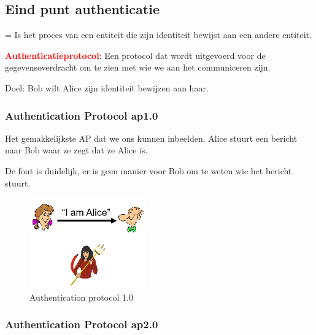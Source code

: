 \newpage
\subsection{Eind punt authenticatie}

\noindent = Is het proces van een entiteit die zijn identiteit bewijst aan een andere entiteit.

\noindent \textcolor{red}{\textbf{Authenticatieprotocol}}: Een protocol dat wordt uitgevoerd voor de gegevensoverdracht om te zien met wie we aan het communiceren zijn.

\noindent Doel: Bob wilt Alice zijn identiteit bewijzen aan haar.

\subsubsection{Authentication Protocol ap1.0}

\noindent Het gemakkelijkste AP dat we ons kunnen inbeelden. Alice stuurt een bericht naar Bob waar ze zegt dat ze Alice is.

\noindent De fout is duidelijk, er is geen manier voor Bob om te weten wie het bericht stuurt.


\begin{figure}[h]
    \centering
    \includegraphics[width=2in]{./img/imghfdst8/hfdst8puntje13.png}
    \caption{Authentication protocol 1.0}      
    \label{fig:Authentication protocol 1.0 }
\end{figure}

\newpage

\subsubsection{Authentication Protocol ap2.0}

